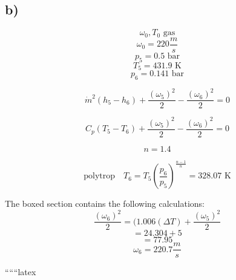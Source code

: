 

\subsection*{b)}

\[
\omega_0, T_0 \text{ gas}
\]
\[
\omega_0 = 220 \frac{m}{s}
\]
\[
p_5 = 0.5 \text{ bar}
\]
\[
T_5 = 431.9 \text{ K}
\]
\[
p_6 = 0.141 \text{ bar}
\]

\[
\dot{m}^2 (h_5 - h_6) + \frac{(\omega_5)^2}{2} - \frac{(\omega_6)^2}{2} = 0
\]

\[
C_p (T_5 - T_6) + \frac{(\omega_5)^2}{2} - \frac{(\omega_6)^2}{2} = 0
\]

\[
n = 1.4
\]

\[
\text{polytrop} \quad T_6 = T_5 \left( \frac{p_6}{p_5} \right)^{\frac{n-1}{n}} = 328.07 \text{ K}
\]

\begin{center}
\begin{minipage}{0.8\textwidth}
The boxed section contains the following calculations:
\[
\frac{(\omega_6)^2}{2} = (1.006 (\Delta T) + \frac{(\omega_5)^2}{2}
\]
\[
= 24.304 + 5
\]
\[
= 77.95
\]
\[
\omega_6 = 220.7 \frac{m}{s}
\]
\end{minipage}
\end{center}

``````latex